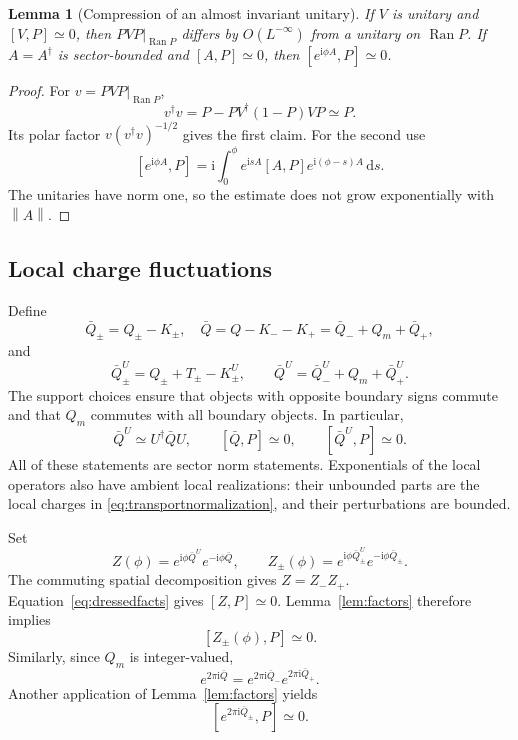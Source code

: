 \documentclass[11pt]{article}
\newtheorem{lemma}[theorem]{Lemma}
\theoremstyle{definition}
\theoremstyle{remark}
\newcommand{\ii}{\mathrm i}
\newcommand{\dd}{\,\mathrm d}
\newcommand{\Ran}{\operatorname{Ran}}
\newcommand{\epsL}{O(L^{-\infty})}
\newcommand{\eqL}{\simeq}
\newcommand{\norm}[1]{\left\lVert#1\right\rVert}
\begin{document}
\begin{lemma}[Compression of an almost invariant unitary]\label{lem:polar}
If \(V\) is unitary and \([V,P]\eqL0\), then
\(PVP|_{\Ran P}\) differs by \(\epsL\) from a unitary on
\(\Ran P\).  If \(A=A^\dagger\) is sector-bounded and
\([A,P]\eqL0\), then \([e^{\ii\phi A},P]\eqL0\).
\end{lemma}
\begin{proof}
For \(v=PVP|_{\Ran P}\),
\[
 v^\dagger v=P-PV^\dagger(1-P)VP\eqL P.
\]
Its polar factor \(v(v^\dagger v)^{-1/2}\) gives the first claim.
For the second use
\[
 [e^{\ii\phi A},P]
 =\ii\int_0^\phi e^{\ii sA}[A,P]e^{\ii(\phi-s)A}\dd s.
\]
The unitaries have norm one, so the estimate does not grow
exponentially with \(\norm A\).
\end{proof}

\subsection{Local charge fluctuations}

Define
\[
 \bar Q_\pm=Q_\pm-K_\pm,\quad
 \bar Q=Q-K_--K_+=\bar Q_-+Q_m+\bar Q_+,
\]
and
\[
 \bar Q_\pm^U=Q_\pm+T_\pm-K_\pm^U,\qquad
 \bar Q^U=\bar Q_-^U+Q_m+\bar Q_+^U.
\]
The support choices ensure that objects with opposite boundary
signs commute and that \(Q_m\) commutes with all boundary objects.
In particular,
\begin{equation}\label{eq:dressedfacts}
 \bar Q^U\eqL U^\dagger\bar Q U,\qquad
 [\bar Q,P]\eqL0,\qquad [\bar Q^U,P]\eqL0.
\end{equation}
All of these statements are sector norm statements.  Exponentials
of the local operators also have ambient local realizations:
their unbounded parts are the local charges in
\eqref{eq:transportnormalization}, and their perturbations are bounded.

Set
\begin{equation}\label{eq:Z}
 Z(\phi)=e^{\ii\phi\bar Q^U}e^{-\ii\phi\bar Q},\qquad
 Z_\pm(\phi)=e^{\ii\phi\bar Q_\pm^U}e^{-\ii\phi\bar Q_\pm}.
\end{equation}
The commuting spatial decomposition gives \(Z=Z_-Z_+\).
Equation~\eqref{eq:dressedfacts} gives \([Z,P]\eqL0\).
Lemma~\ref{lem:factors} therefore implies
\begin{equation}\label{eq:Zpreserve}
 [Z_\pm(\phi),P]\eqL0.
\end{equation}
Similarly, since \(Q_m\) is integer-valued,
\[
 e^{2\pi\ii\bar Q}
   =e^{2\pi\ii\bar Q_-}e^{2\pi\ii\bar Q_+}.
\]
Another application of Lemma~\ref{lem:factors} yields
\begin{equation}\label{eq:Vpreserve}
 [e^{2\pi\ii\bar Q_\pm},P]\eqL0.
\end{equation}
\end{document}

